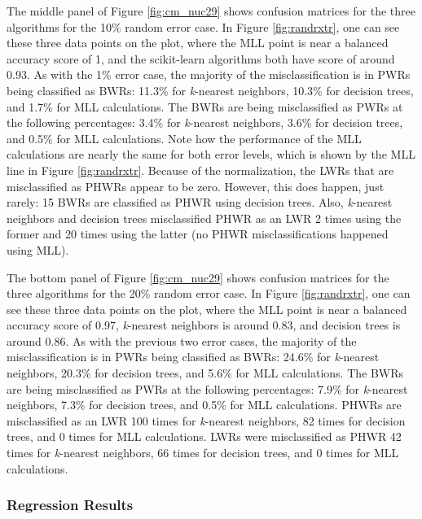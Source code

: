 The middle panel of Figure \ref{fig:cm_nuc29} shows confusion matrices for the
three algorithms for the 10\% random error case. In Figure \ref{fig:randrxtr},
one can see these three data points on the plot, where the \gls{MLL} point is
near a balanced accuracy score of 1, and the scikit-learn algorithms both have
score of around 0.93. As with the 1\% error case, the majority of the
misclassification is in \gls{PWR}s being classified as \gls{BWR}s: 11.3\% for
\textit{k}-nearest neighbors, 10.3\% for decision trees, and 1.7\% for
\gls{MLL} calculations.  The \gls{BWR}s are being misclassified as \gls{PWR}s
at the following percentages: 3.4\% for \textit{k}-nearest neighbors, 3.6\% for
decision trees, and 0.5\% for \gls{MLL} calculations. Note how the performance
of the \gls{MLL} calculations are nearly the same for both error levels, which
is shown by the \gls{MLL} line in Figure \ref{fig:randrxtr}. Because of the
normalization, the \gls{LWR}s that are misclassified as \gls{PHWR}s appear to
be zero. However, this does happen, just rarely: 15 \gls{BWR}s are classified
as \gls{PHWR} using decision trees. Also, \textit{k}-nearest neighbors and
decision trees misclassified \gls{PHWR} as an \gls{LWR} 2 times using the
former and 20 times using the latter (no \gls{PHWR} misclassifications happened
using \gls{MLL}).

The bottom panel of Figure \ref{fig:cm_nuc29} shows confusion matrices for the
three algorithms for the 20\% random error case. In Figure \ref{fig:randrxtr},
one can see these three data points on the plot, where the \gls{MLL} point is
near a balanced accuracy score of 0.97, \textit{k}-nearest neighbors is around
0.83, and decision trees is around 0.86. As with the previous two error cases,
the majority of the misclassification is in \gls{PWR}s being classified as
\gls{BWR}s: 24.6\% for \textit{k}-nearest neighbors, 20.3\% for decision trees,
and 5.6\% for \gls{MLL} calculations.  The \gls{BWR}s are being misclassified
as \gls{PWR}s at the following percentages: 7.9\% for \textit{k}-nearest
neighbors, 7.3\% for decision trees, and 0.5\% for \gls{MLL} calculations.
\Gls{PHWR}s are misclassified as an \gls{LWR} 100 times for \textit{k}-nearest
neighbors, 82 times for decision trees, and 0 times for \gls{MLL} calculations.
\Gls{LWR}s were misclassified as \gls{PHWR} 42 times for \textit{k}-nearest
neighbors, 66 times for decision trees, and 0 times for \gls{MLL} calculations.

\subsubsection{Regression Results}
\label{sec:randerrB}

